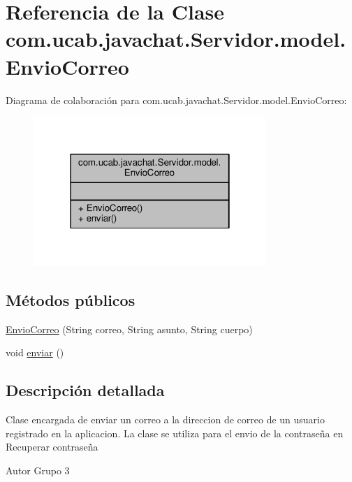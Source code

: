 \hypertarget{classcom_1_1ucab_1_1javachat_1_1_servidor_1_1model_1_1_envio_correo}{\section{Referencia de la Clase com.\-ucab.\-javachat.\-Servidor.\-model.\-Envio\-Correo}
\label{classcom_1_1ucab_1_1javachat_1_1_servidor_1_1model_1_1_envio_correo}
}


Diagrama de colaboración para com.\-ucab.\-javachat.\-Servidor.\-model.\-Envio\-Correo\-:
\nopagebreak
\begin{figure}[H]
\begin{center}
\leavevmode
\includegraphics[width=250pt]{dd/d61/classcom_1_1ucab_1_1javachat_1_1_servidor_1_1model_1_1_envio_correo__coll__graph}
\end{center}
\end{figure}
\subsection*{Métodos públicos}
\begin{DoxyCompactItemize}
\item 
\hyperlink{classcom_1_1ucab_1_1javachat_1_1_servidor_1_1model_1_1_envio_correo_aba6fd1242773c58ff4d3cd57162849d6}{Envio\-Correo} (String correo, String asunto, String cuerpo)
\item 
void \hyperlink{classcom_1_1ucab_1_1javachat_1_1_servidor_1_1model_1_1_envio_correo_a0698bb7315db4d54d94ca94d95226754}{enviar} ()
\end{DoxyCompactItemize}


\subsection{Descripción detallada}
Clase encargada de enviar un correo a la direccion de correo de un usuario registrado en la aplicacion. La clase se utiliza para el envio de la contraseña en Recuperar contraseña \begin{DoxyAuthor}{Autor}
Grupo 3 
\end{DoxyAuthor}


